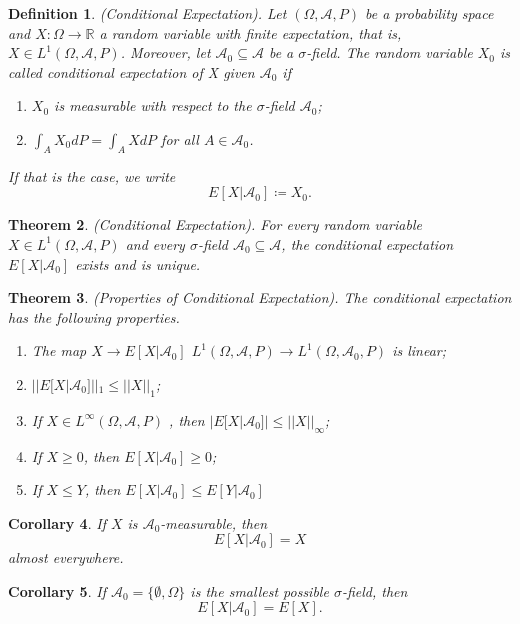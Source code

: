 \documentclass[twoside]{article}
\newcounter{lecnum}
\newtheorem{theorem}{Theorem}[lecnum]
\newtheorem{corollary}[theorem]{Corollary}
\newtheorem{definition}[theorem]{Definition}
\begin{document}
\begin{definition}(Conditional Expectation). Let $(\Omega, \mathcal{A}, P)$ be a probability space and $X: \Omega \rightarrow \mathbb{R}$ a random variable with finite expectation, that is, $X \in L^1(\Omega, \mathcal{A},P)$. Moreover, let $\mathcal{A}_0 \subseteq \mathcal{A}$ be a $\sigma$-field. The random variable $X_0$ is called conditional expectation of X given $\mathcal{A}_0$ if
\begin{enumerate}
    \item $X_0$ is measurable with respect to the $\sigma$-field $\mathcal{A}_0$;
    \item $\int_AX_0dP = \int_AXdP$ for all $A \in \mathcal{A}_0$.
\end{enumerate}
If that is the case, we write
$$
E[X|\mathcal{A}_0] \coloneqq X_0.
$$
\end{definition}

\begin{theorem}(Conditional Expectation). For every random variable $X \in L^1(\Omega, \mathcal{A},P)$ and every $\sigma$-field $\mathcal{A}_0 \subseteq \mathcal{A}$, the conditional expectation $E[X|\mathcal{A}_0]$ exists and is unique. 
\end{theorem}

\begin{theorem}(Properties of Conditional Expectation). The conditional expectation has the following properties.

\begin{enumerate}
    \item The map $X \rightarrow E[X|\mathcal{A}_0]$ $L^1(\Omega, \mathcal{A}, P) \rightarrow L^1(\Omega, \mathcal{A}_0,P)$ is linear;
    \item $||E[X|\mathcal{A}_0]||_1 \leq ||X||_1$;
    \item If $X \in L^{\infty}(\Omega, \mathcal{A}, P)$ , then $|E[X|\mathcal{A}_0]| \leq ||X||_{\infty}$;
    \item If $X \geq 0$, then $E[X|\mathcal{A}_0] \geq 0$;
    \item If $X \leq Y$, then $E[X|\mathcal{A}_0] \leq E[Y|\mathcal{A}_0]$
\end{enumerate}
\end{theorem}

\begin{corollary} If $X$ is $\mathcal{A}_0$-measurable, then 
$$
E[X|\mathcal{A}_0] = X
$$
almost everywhere.
\end{corollary}

\begin{corollary} If $\mathcal{A}_0 = \{\emptyset, \Omega\}$ is the smallest possible $\sigma$-field, then 
$$
E[X|\mathcal{A}_0] = E[X].
$$
\end{corollary}
\end{document}
